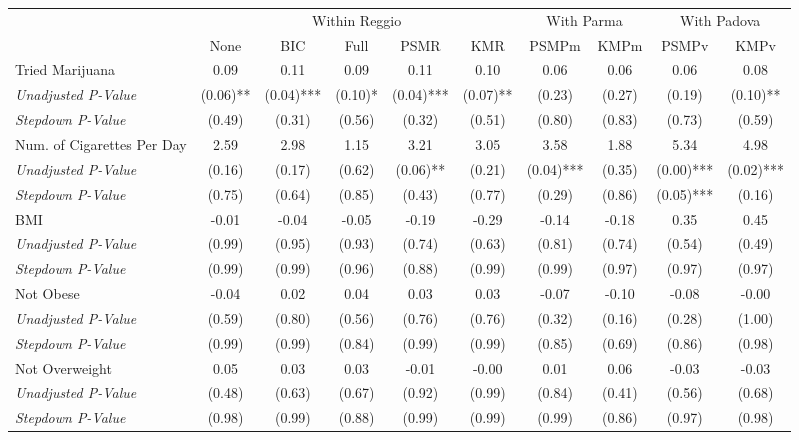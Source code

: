 \begin{tabular}{l c c c c c c c c c}
\toprule
& \multicolumn{5}{c}{Within Reggio} & \multicolumn{2}{c}{With Parma} & \multicolumn{2}{c}{With Padova} \\\cmidrule(lr){2-6} \cmidrule(lr){7-8} \cmidrule(lr){9-10}
 & None & BIC & Full & PSMR & KMR & PSMPm & KMPm & PSMPv & KMPv \\
\midrule
Tried Marijuana & 0.09 & 0.11 & 0.09 & 0.11 & 0.10 & 0.06 & 0.06 & 0.06 & 0.08 \\
\quad \textit{Unadjusted P-Value} & (0.06)** & (0.04)*** & (0.10)* & (0.04)*** & (0.07)** & (0.23) & (0.27) & (0.19) & (0.10)** \\
\quad \textit{Stepdown P-Value} & (0.49) & (0.31) & (0.56) & (0.32) & (0.51) & (0.80) & (0.83) & (0.73) & (0.59) \\
Num. of Cigarettes Per Day & 2.59 & 2.98 & 1.15 & 3.21 & 3.05 & 3.58 & 1.88 & 5.34 & 4.98 \\
\quad \textit{Unadjusted P-Value} & (0.16) & (0.17) & (0.62) & (0.06)** & (0.21) & (0.04)*** & (0.35) & (0.00)*** & (0.02)*** \\
\quad \textit{Stepdown P-Value} & (0.75) & (0.64) & (0.85) & (0.43) & (0.77) & (0.29) & (0.86) & (0.05)*** & (0.16) \\
BMI & -0.01 & -0.04 & -0.05 & -0.19 & -0.29 & -0.14 & -0.18 & 0.35 & 0.45 \\
\quad \textit{Unadjusted P-Value} & (0.99) & (0.95) & (0.93) & (0.74) & (0.63) & (0.81) & (0.74) & (0.54) & (0.49) \\
\quad \textit{Stepdown P-Value} & (0.99) & (0.99) & (0.96) & (0.88) & (0.99) & (0.99) & (0.97) & (0.97) & (0.97) \\
Not Obese & -0.04 & 0.02 & 0.04 & 0.03 & 0.03 & -0.07 & -0.10 & -0.08 & -0.00 \\
\quad \textit{Unadjusted P-Value} & (0.59) & (0.80) & (0.56) & (0.76) & (0.76) & (0.32) & (0.16) & (0.28) & (1.00) \\
\quad \textit{Stepdown P-Value} & (0.99) & (0.99) & (0.84) & (0.99) & (0.99) & (0.85) & (0.69) & (0.86) & (0.98) \\
Not Overweight & 0.05 & 0.03 & 0.03 & -0.01 & -0.00 & 0.01 & 0.06 & -0.03 & -0.03 \\
\quad \textit{Unadjusted P-Value} & (0.48) & (0.63) & (0.67) & (0.92) & (0.99) & (0.84) & (0.41) & (0.56) & (0.68) \\
\quad \textit{Stepdown P-Value} & (0.98) & (0.99) & (0.88) & (0.99) & (0.99) & (0.99) & (0.86) & (0.97) & (0.98) \\

\end{tabular}
